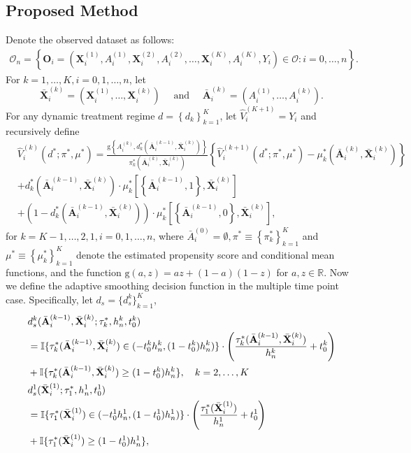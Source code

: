 \documentclass[11pt]{article}
\theoremstyle{referenceplain}
\theoremstyle{referencedefinition}
\theoremstyle{referenceremark}
\begin{document}
\subsection{Proposed Method}\label{appB2}
Denote the observed dataset as follows:
\begin{align*}
    \mathcal{O}_n = \left\{\mathbf{O}_i=\left(\mathbf{X}_i^{(1)}, A_i^{(1)}, \mathbf{X}_i^{(2)}, A_i^{(2)}, \ldots, \mathbf{X}_i^{(K)}, A_i^{(K)}, Y_i\right)\in\mathcal{O}: i=0, \ldots, n\right\} .
\end{align*}
For $k=1, \ldots, K, i=0,1, \ldots, n$, let
$$
\bar{\mathbf{X}}_i^{(k)}=\left(\mathbf{X}_i^{(1)}, \ldots, \mathbf{X}_i^{(k)}\right) \quad \text { and } \quad \bar{\mathbf{A}}_i^{(k)}=\left(A_i^{(1)}, \ldots, A_i^{(k)}\right).
$$
For any dynamic treatment regime $d=\left\{d_k\right\}_{k=1}^K$, let $\widehat{V}_i^{(K+1)}=Y_i$ and recursively define
$$
\begin{aligned}
&\widehat{V}_i^{(k)}\left(d^* ; \pi^*, \mu^*\right)  =\frac{\mathrm{g}\left\{A_i^{(k)}, d_k^*\left(\bar{\mathbf{A}}_i^{(k-1)}, \bar{\mathbf{X}}_i^{(k)}\right)\right\}}{\pi_k^*\left(\bar{\mathbf{A}}_i^{(k)}, \bar{\mathbf{X}}_i^{(k)}\right)}\left\{\widehat{V}_i^{(k+1)}\left(d^* ; \pi^*, \mu^*\right)-\mu_k^*\left(\bar{\mathbf{A}}_i^{(k)}, \bar{\mathbf{X}}_i^{(k)}\right)\right\} \\
 &+d_k^*\left(\bar{\mathbf{A}}_i^{(k-1)}, \bar{\mathbf{X}}_i^{(k)}\right)\cdot \mu_k^*\left[\left\{\bar{\mathbf{A}}_i^{(k-1)}, 1\right\}, \bar{\mathbf{X}}_i^{(k)}\right]\\
 &+\left(1-d_k^*\left(\bar{\mathbf{A}}_i^{(k-1)}, \bar{\mathbf{X}}_i^{(k)}\right)\right)\cdot \mu_k^*\left[\left\{\bar{\mathbf{A}}_i^{(k-1)}, 0\right\}, \bar{\mathbf{X}}_i^{(k)}\right],
\end{aligned}
$$
for $k=K-1, \ldots, 2,1, i=0,1, \ldots, n$, where $\bar{A}_i^{(0)}=\emptyset, \pi^* \equiv\left\{\pi_k^*\right\}_{k=1}^K$ and $\mu^* \equiv\left\{\mu_k^*\right\}_{k=1}^K$ denote the estimated propensity score and conditional mean functions, and the function $\mathrm{g}(a, z)=a z+(1-a)(1-z)$ for $a, z \in \mathbb{R}$. Now we define the adaptive smoothing decision function in the multiple time point case. Specifically, let $d_{s}=\{d_{s}^k\}_{k=1}^K$,
\begin{align*}
    &d_{s}^k(\Bar{\mathbf{A}}_{i}^{(k-1)},\bar{\mathbf{X}}_i^{(k)};\tau_k^*,h_n^k,t_0^k)\\
    &=\mathbb{I}\{\tau_k^*(\Bar{\mathbf{A}}_{i}^{(k-1)},\bar{\mathbf{X}}_i^{(k)})\in(-t_0^k h_n^k, (1-t_0^k)h_n^k)\}\cdot \left(\frac{\tau_k^*(\Bar{\mathbf{A}}_{i}^{(k-1)},\bar{\mathbf{X}}_i^{(k)})}{h_n^k}+t_0^k\right)\\
    &+\mathbb{I}\{\tau_k^*(\Bar{\mathbf{A}}_{i}^{(k-1)},\bar{\mathbf{X}}_i^{(k)})\ge (1-t_0^k)h_n^k\}, \quad k=2,\dots,K\\
     &d_{s}^1(\bar{\mathbf{X}}_i^{(1)};\tau_1^*,h_n^1,t_0^1)\\
     &=\mathbb{I}\{\tau_1^*(\bar{\mathbf{X}}_i^{(1)})\in(-t_0^1 h_n^1, (1-t_0^1)h_n^1)\}\cdot \left(\frac{\tau_1^*(\bar{\mathbf{X}}_i^{(1)})}{h_n^1}+t_0^1\right)\\
    &+\mathbb{I}\{\tau_1^*(\bar{\mathbf{X}}_i^{(1)})\ge (1-t_0^1)h_n^1\},
\end{align*}
\end{document}
